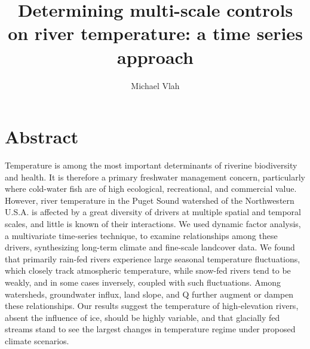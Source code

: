 \documentclass[notitlepage]{article}
\author{Michael Vlah}
\title{Determining multi-scale controls on river temperature: a time series approach}
\begin{document}

\maketitle
\clearpage


\section*{Abstract}
Temperature is among the most important determinants of riverine biodiversity and health. It is therefore a primary freshwater management concern, particularly where cold-water fish are of high ecological, recreational, and commercial value. However, river temperature in the Puget Sound watershed of the Northwestern U.S.A. is affected by a great diversity of drivers at multiple spatial and temporal scales, and little is known of their interactions. We used dynamic factor analysis, a multivariate time-series technique, to examine relationships among these drivers, synthesizing long-term climate and fine-scale landcover data. We found that primarily rain-fed rivers experience large seasonal temperature fluctuations, which closely track atmospheric temperature, while snow-fed rivers tend to be weakly, and in some cases inversely, coupled with such fluctuations. Among watersheds, groundwater influx, land slope, and Q further augment or dampen these relationships. Our results suggest the temperature of high-elevation rivers, absent the influence of ice, should be highly variable, and that glacially fed streams stand to see the largest changes in temperature regime under proposed climate scenarios.
\clearpage
\end{document}
